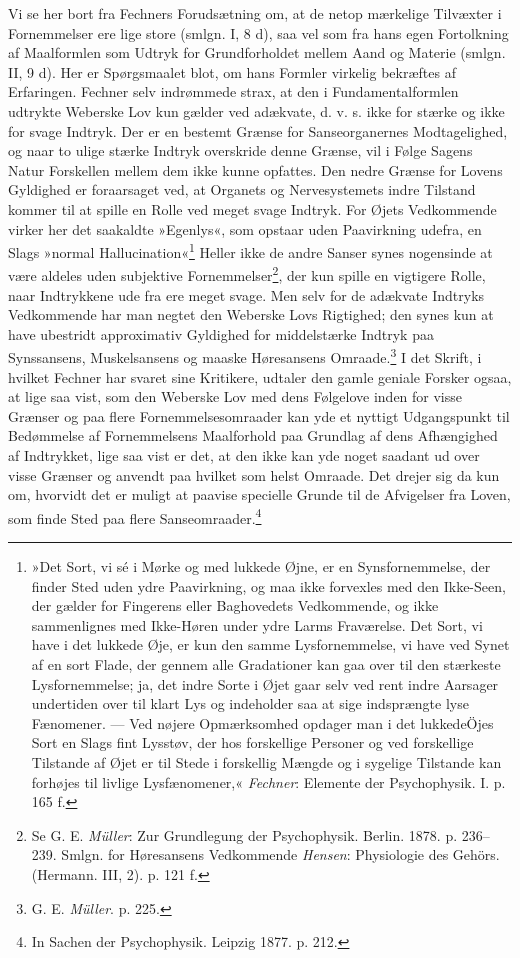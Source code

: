 \documentclass[12pt,a4paper,openany]{book}
\newcommand{\opage}[1]{\marginnote{\footnotesize\textit{[#1]}}}
\begin{document}
Vi se her bort fra Fechners Forudsætning om, at de netop mærkelige
Tilvæxter i Fornemmelser ere lige store (smlgn. I, 8 d), saa vel som fra
hans egen Fortolkning af Maalformlen som Udtryk for Grundforholdet
mellem Aand og Materie (smlgn. II, 9 d). Her er Spørgsmaalet blot, om
hans Formler virkelig bekræftes af Erfaringen. Fechner selv indrømmede
strax, at den i Fundamentalformlen udtrykte Weberske Lov kun gælder ved
adækvate, d. v. s. ikke for stærke og ikke for svage Indtryk. Der er en
bestemt Grænse for Sanseorganernes Modtagelighed, og naar to ulige
stærke Indtryk overskride denne Grænse, vil i Følge Sagens Natur
Forskellen mellem dem ikke kunne opfattes. Den nedre Grænse for Lovens
Gyldighed er foraarsaget ved, at Organets og Nervesystemets indre
Tilstand kommer til at spille en Rolle ved meget svage Indtryk. For
Øjets Vedkommende virker her det saakaldte »Egenlys«, som opstaar uden
Paavirkning udefra, en Slags »normal Hallucination«\footnote[1]{»Det
Sort, vi sé i Mørke og med lukkede Øjne, er en Synsfornemmelse, der
finder Sted uden ydre Paavirkning, og maa ikke forvexles med den
Ikke-Seen, der gælder for Fingerens eller Baghovedets Vedkommende, og
ikke sammenlignes med Ikke-Høren under ydre Larms Fraværelse. Det Sort,
vi have i det lukkede Øje, er kun den samme Lysfornemmelse, vi have ved
Synet af en sort Flade, der gennem alle Gradationer kan gaa over til den
stærkeste Lysfornemmelse; ja, det indre Sorte i Øjet gaar selv ved rent
indre Aarsager undertiden over til klart Lys og indeholder saa at sige
indsprængte lyse Fænomener. --- Ved nøjere Opmærksomhed opdager man i
det lukkedeÖjes Sort en Slags fint Lysstøv, der hos forskellige Personer
og ved forskellige Tilstande af Øjet er til Stede i forskellig Mængde og
i sygelige Tilstande kan forhøjes til livlige Lysfænomener,«
\emph{Fechner}: Elemente der Psychophysik. I. p. 165 f.} Heller ikke de
andre Sanser synes nogensinde at
\opage{134}være aldeles uden subjektive Fornemmelser\footnote[1]{Se G.
E. \emph{Müller}: Zur Grundlegung der Psychophysik. Berlin. 1878. p.
236-- 239. Smlgn. for Høresansens Vedkommende \emph{Hensen}: Physiologie
des Gehörs. (Hermann. III, 2). p. 121 f.}, der kun spille en vigtigere
Rolle, naar Indtrykkene ude fra ere meget svage. Men selv for de
adækvate Indtryks Vedkommende har man negtet den Weberske Lovs
Rigtighed; den synes kun at have ubestridt approximativ Gyldighed for
middelstærke Indtryk paa Synssansens, Muskelsansens og maaske
Høresansens Omraade.\footnote[2]{G. E. \emph{Müller}. p. 225.} I det
Skrift, i hvilket Fechner har svaret sine Kritikere, udtaler den gamle
geniale Forsker ogsaa, at lige saa vist, som den Weberske Lov med dens
Følgelove inden for visse Grænser og paa flere Fornemmelsesomraader kan
yde et nyttigt Udgangspunkt til Bedømmelse af Fornemmelsens Maalforhold
paa Grundlag af dens Afhængighed af Indtrykket, lige saa vist er det, at
den ikke kan yde noget saadant ud over visse Grænser og anvendt paa
hvilket som helst Omraade. Det drejer sig da kun om, hvorvidt det er
muligt at paavise specielle Grunde til de Afvigelser fra Loven, som
finde Sted paa flere Sanseomraader.\footnote[3]{In Sachen der
Psychophysik. Leipzig 1877. p. 212.}
\end{document}
